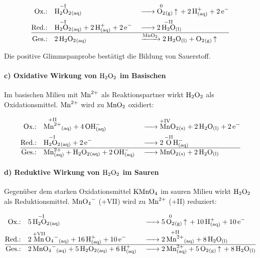 \begin{align}
    \text{Ox.:}\quad  &
    \ce{\overset{\mathrm{-I}}{\ce{H2O2}}_{(aq)}}
                      &   & \ce{-> \overset{\mathrm{0}}{\ce{O2}}_{(g)} ^ + 2 H^+_{(aq)} + 2 e^-} \\
    \text{Red.:}\quad &
    \ce{\overset{\mathrm{-I}}{\ce{H2O2}}_{(aq)} + 2 H^+_{(aq)} + 2 e^-}
                      &   & \ce{-> 2 \overset{\mathrm{-II}}{\ce{H2O}}_{(l)}}                     \\
    \hline
    \text{Ges.:}\quad &
    \ce{2 H2O2_{(aq)}}
                      &   & \ce{->[ MnO2 ] 2 H2O_{(l)} + O2_{(g)} ^}
\end{align}

Die positive Glimmspanprobe bestätigt die Bildung von Sauerstoff.\cite{skript}

\paragraph{c) Oxidative Wirkung von $\ce{H2O2}$ im Basischen}
Im basischen Milieu mit $\ce{Mn^{2+}}$ als Reaktionspartner wirkt $\ce{H2O2}$ als Oxidationsmittel. $\ce{Mn^{2+}}$ wird zu $\ce{MnO2}$ oxidiert:

\begin{align}
    \text{Ox.:}\quad  &
    \ce{\overset{\mathrm{+II}}{\ce{Mn^{2+}}}_{(aq)} + 4 OH^-_{(aq)}}
                      &   & \ce{-> \overset{\mathrm{+IV}}{\ce{Mn}}O2_{(s)} + 2 H2O_{(l)} + 2 e^-} \\
    \text{Red.:}\quad &
    \ce{\overset{\mathrm{-I}}{\ce{H2O2}}_{(aq)} + 2 e^-}
                      &   & \ce{-> 2 \overset{\mathrm{-II}}{\ce{O}}H^-_{(aq)}}                    \\
    \hline
    \text{Ges.:}\quad &
    \ce{Mn^{2+}_{(aq)} + H2O2_{(aq)} + 2 OH^-_{(aq)}}
                      &   & \ce{-> MnO2_{(s)} + 2 H2O_{(l)}}
\end{align}

\paragraph{d) Reduktive Wirkung von $\ce{H2O2}$ im Sauren}
Gegenüber dem starken Oxidationsmittel $\ce{KMnO4}$ im sauren Milieu wirkt $\ce{H2O2}$ als Reduktionsmittel. $\ce{MnO4^-}$ (+VII) wird zu $\ce{Mn^{2+}}$ (+II) reduziert:

\begin{align}
    \text{Ox.:}\quad  &
    \ce{5 \overset{\mathrm{-I}}{\ce{H2O2}}_{(aq)}}
                      &   & \ce{-> 5 \overset{\mathrm{0}}{\ce{O2}}_{(g)} ^ + 10 H^+_{(aq)} + 10 e^-} \\
    \text{Red.:}\quad &
    \ce{2 \overset{\mathrm{+VII}}{\ce{Mn}}O4^-_{(aq)} + 16 H^+_{(aq)} + 10 e^-}
                      &   & \ce{-> 2 \overset{\mathrm{+II}}{\ce{Mn^{2+}}}_{(aq)} + 8 H2O_{(l)}}      \\
    \hline
    \text{Ges.:}\quad &
    \ce{2 MnO4^-_{(aq)} + 5 H2O2_{(aq)} + 6 H^+_{(aq)}}
                      &   & \ce{-> 2 Mn^{2+}_{(aq)} + 5 O2_{(g)} ^ + 8 H2O_{(l)}}
\end{align}

